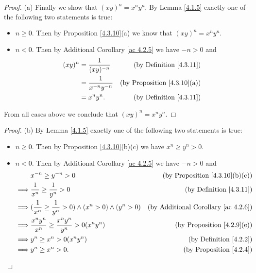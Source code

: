 \begin{proof}{(a)}
    Finally we show that \((xy)^n = x^n y^n\).
    By Lemma \ref{4.1.5} exactly one of the following two statements is true:
    \begin{itemize}
        \item \(n \geq 0\).
              Then by Proposition \ref{4.3.10}(a) we know that \((xy)^n = x^n y^n\).
        \item \(n < 0\).
              Then by Additional Corollary \ref{ac 4.2.5} we have \(-n > 0\) and
              \begin{align*}
                  (xy)^n & = \frac{1}{(xy)^{-n}}     & \text{(by Definition \ref{4.3.11})}     \\
                         & = \frac{1}{x^{-n} y^{-n}} & \text{(by Proposition \ref{4.3.10}(a))} \\
                         & = x^n y^n.                & \text{(by Definition \ref{4.3.11})}
              \end{align*}
    \end{itemize}
    From all cases above we conclude that \((xy)^n = x^n y^n\).
\end{proof}

\begin{proof}{(b)}
    By Lemma \ref{4.1.5} exactly one of the following two statements is true:
    \begin{itemize}
        \item \(n \geq 0\).
              Then by Proposition \ref{4.3.10}(b)(c) we have \(x^n \geq y^n > 0\).
        \item \(n < 0\).
              Then by Additional Corollary \ref{ac 4.2.5} we have \(-n > 0\) and
              \begin{align*}
                           & x^{-n} \geq y^{-n} > 0                                                 & \text{(by Proposition \ref{4.3.10}(b)(c))}      \\
                  \implies & \frac{1}{x^n} \geq \frac{1}{y^n} > 0                                   & \text{(by Definition \ref{4.3.11})}             \\
                  \implies & (\frac{1}{x^n} \geq \frac{1}{y^n} > 0) \land (x^n > 0) \land (y^n > 0) & \text{(by Additional Corollary \ref{ac 4.2.6})} \\
                  \implies & \frac{x^n y^n}{x^n} \geq \frac{x^n y^n}{y^n} > 0(x^n y^n)              & \text{(by Proposition \ref{4.2.9}(e))}          \\
                  \implies & y^n \geq x^n > 0(x^n y^n)                                              & \text{(by Definition \ref{4.2.2})}              \\
                  \implies & y^n \geq x^n > 0.                                                      & \text{(by Proposition \ref{4.2.4})}
              \end{align*}
    \end{itemize}
\end{proof}

